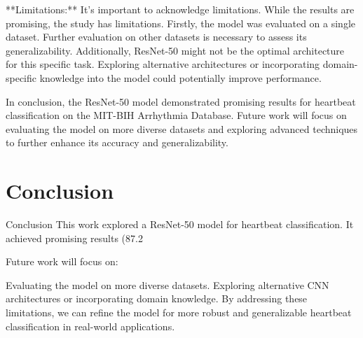 \documentclass[conference]{IEEEtran}
\begin{document}
**Limitations:** It's important to acknowledge limitations. While the results are promising, the study has limitations.  Firstly, the model was evaluated on a single dataset.  Further evaluation on other datasets is necessary to assess its generalizability. Additionally, ResNet-50 might not be the optimal architecture for this specific task. Exploring alternative architectures or incorporating domain-specific knowledge into the model could potentially improve performance.

In conclusion, the ResNet-50 model demonstrated promising results for heartbeat classification on the MIT-BIH Arrhythmia Database. Future work will focus on evaluating the model on more diverse datasets and exploring advanced techniques to further enhance its accuracy and generalizability.


\section{Conclusion}
Conclusion
This work explored a ResNet-50 model for heartbeat classification. It achieved promising results (87.2%

Future work will focus on:

Evaluating the model on more diverse datasets.
Exploring alternative CNN architectures or incorporating domain knowledge.
By addressing these limitations, we can refine the model for more robust and generalizable heartbeat classification in real-world applications.
\end{document}
